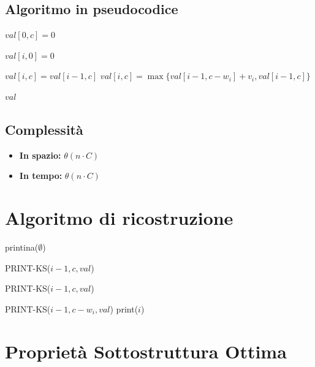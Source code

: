 \subsection{Algoritmo in pseudocodice}
\begin{algorithm}
    \caption{Algoritmo Bottom-up}
    \begin{algorithmic}
                \State $val[0,c] = 0$
            \EndFor

                \State $val[i,0] = 0$ 
            \EndFor

                        \State $val[i,c] = val[i-1,c]$
                        \Else
                            \State $val[i,c] = \max\{val[i-1,c-w_i] + v_i,val[i-1,c]\}$
                    \EndIf
                \EndFor
            \EndFor

            \State \Return $val$
        \EndProcedure
    \end{algorithmic}
\end{algorithm}

\subsection{Complessità}
\begin{itemize}
    \item \textbf{In spazio:} $\theta(n \cdot C)$
    \item \textbf{In tempo:} $\theta(n \cdot C)$
\end{itemize}

\newpage
\section{Algoritmo di ricostruzione}
\begin{algorithm}
    \begin{algorithmic}
                \State printina($\emptyset$)

                \Else
                        \State PRINT-KS($i-1,c,val$) 

                        \Else
                                \State  PRINT-KS($i-1,c,val$) 

                                \Else
                                    \State PRINT-KS($i-1, c-w_i,val$) 
                                    \State print($i$)
                            \EndIf
                    \EndIf
            \EndIf
        \EndProcedure
    \end{algorithmic}
\end{algorithm}

\section{Proprietà Sottostruttura Ottima}